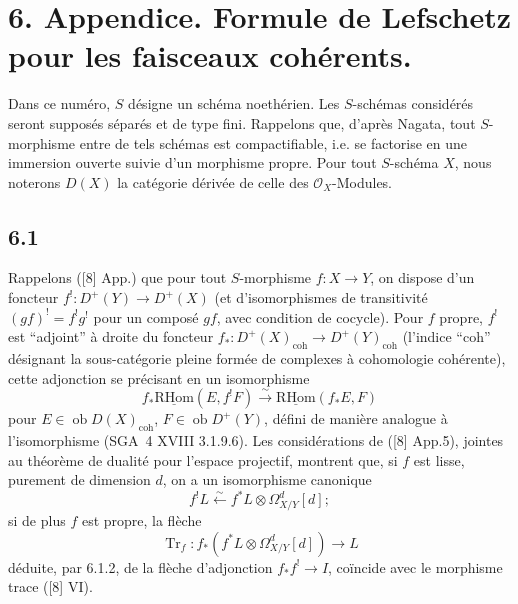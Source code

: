 \documentclass[11pt]{article}
\providecommand{\cO}{\mathcal{O}}
\newcommand{\R}{\mathrm{R}}\newcommand{\RHomCore}{\mathrm{RHom}}
\providecommand{\RHom}{\RHomCore}
\providecommand{\uRHom}{\underline{\RHom}}
\providecommand{\RHom}{\RHomCore}
\providecommand{\RHom}{\R\mathcal{H}om}
\providecommand{\R}{\mathrm R}
\providecommand{\RHom}{\RHomCore}
\begin{document}
\section*{6. Appendice. Formule de Lefschetz pour les faisceaux cohérents.}

Dans ce numéro, $S$ désigne un schéma noethérien. Les $S$-schémas considérés seront supposés séparés et de type fini. Rappelons que, d'après Nagata, tout $S$-morphisme entre de tels schémas est compactifiable, i.e. se factorise en une immersion ouverte suivie d'un morphisme propre. Pour tout $S$-schéma $X$, nous noterons $D(X)$ la catégorie dérivée de celle des $\cO_X$-Modules.

\subsection*{6.1}
Rappelons ([8] App.) que pour tout $S$-morphisme $f:X\to Y$, on dispose d'un foncteur $f^!:D^+(Y)\longrightarrow D^+(X)$ (et d'isomorphismes de transitivité $(gf)^! = f^!g^!$ pour un composé $gf$, avec condition de cocycle). Pour $f$ propre, $f^!$ est ``adjoint'' à droite du foncteur $f_*:D^+(X)_{\mathrm{coh}}\to D^+(Y)_{\mathrm{coh}}$ (l'indice ``coh'' désignant la sous-catégorie pleine formée de complexes à cohomologie cohérente), cette adjonction se précisant en un isomorphisme
\begin{equation}
\tag{6.1.1}
f_*\uRHom(E,f^!F)\xrightarrow{\sim}\uRHom(f_*E,F)
\end{equation}
pour $E\in\operatorname{ob}D(X)_{\mathrm{coh}}$, $F\in\operatorname{ob}D^+(Y)$, défini de manière analogue à l'isomorphisme (SGA~4 XVIII 3.1.9.6). Les considérations de ([8] App.5), jointes au théorème de dualité pour l'espace projectif, montrent que, si $f$ est lisse, purement de dimension $d$, on a un isomorphisme canonique
\begin{equation}
\tag{6.1.2}
f^!L\xleftarrow{\sim} f^*L\otimes\Omega^d_{X/Y}[d];
\end{equation}
si de plus $f$ est propre, la flèche
\begin{equation}
\tag{6.1.3}
\operatorname{Tr}_f:f_*(f^*L\otimes\Omega^d_{X/Y}[d])\longrightarrow L
\end{equation}
déduite, par 6.1.2, de la flèche d'adjonction $f_*f^!\to I$, coïncide avec le morphisme trace ([8] VI).
\end{document}
